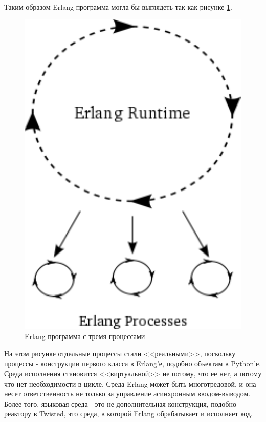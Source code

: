 Таким образом Erlang программа могла бы выглядеть так как рисунке \ref{fig:erlang-1}. 

\begin{figure}[h]
\begin{center}
    \includegraphics[height=0.3\textheight]{images/erlang-1.pdf}
    \caption{Erlang программа с тремя процессами\label{fig:erlang-1}}
\end{center}
\end{figure}


На этом рисунке отдельные процессы стали <<реальными>>, 
поскольку процессы - конструкции первого класса в Erlang'е, 
подобно объектам в Python'е. Среда исполнения становится 
<<виртуальной>> не потому, что ее нет, а потому что нет 
необходимости в цикле. Среда Erlang может быть многотредовой, и 
она несет ответственность не только за управление асинхронным 
вводом-выводом. Более того, языковая среда - это не дополнительная 
конструкция, подобно реактору в Twisted, это среда, в которой 
Erlang обрабатывает и исполняет код.
 


